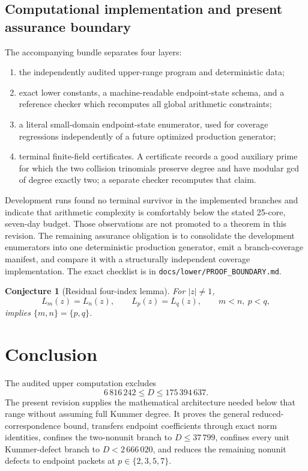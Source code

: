 \documentclass[11pt]{article}
\newtheorem{conjecture}[theorem]{Conjecture}
\theoremstyle{definition}
\begin{document}
\subsection{Computational implementation and present assurance boundary}

The accompanying bundle separates four layers:
\begin{enumerate}[label=(\arabic*)]
\item the independently audited upper-range program and deterministic data;
\item exact lower constants, a machine-readable endpoint-state schema, and
a reference checker which recomputes all global arithmetic constraints;
\item a literal small-domain endpoint-state enumerator, used for coverage
regressions independently of a future optimized production generator;
\item terminal finite-field certificates.  A certificate records a good
auxiliary prime for which the two collision trinomials preserve degree and
have modular gcd of degree exactly two; a separate checker recomputes that
claim.
\end{enumerate}

Development runs found no terminal survivor in the implemented branches and
indicate that arithmetic complexity is comfortably below the stated
25-core, seven-day budget.  Those observations are not promoted to a theorem
in this revision.  The remaining assurance obligation is to consolidate the
development enumerators into one deterministic production generator, emit a
branch-coverage manifest, and compare it with a structurally independent
coverage implementation.  The exact checklist is in
\texttt{docs/lower/PROOF\_BOUNDARY.md}.

\begin{conjecture}[Residual four-index lemma]\label{conj:fourindex}
For \(|z|\neq1\),
\[
 L_m(z)=L_n(z),\qquad L_p(z)=L_q(z),
 \qquad m<n,\ p<q,
\]
implies \(\{m,n\}=\{p,q\}\).
\end{conjecture}

\section*{Conclusion}

The audited upper computation excludes
\[
 6\,816\,242\leq D\leq175\,394\,637.
\]
The present revision supplies the mathematical architecture needed below
that range without assuming full Kummer degree.  It proves the general
reduced-correspondence bound, transfers endpoint coefficients through exact
norm identities, confines the two-nonunit branch to \(D\leq37\,799\),
confines every unit Kummer-defect branch to \(D<2\,666\,020\), and reduces
the remaining nonunit defects to endpoint packets at
\(p\in\{2,3,5,7\}\).
\end{document}
